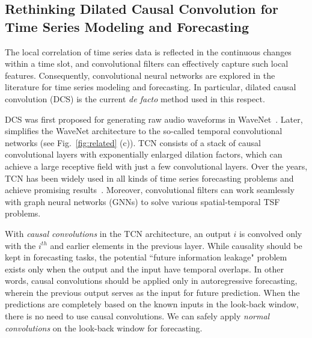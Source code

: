 \documentclass{article}
\begin{document}
\fi


















\subsection{Rethinking Dilated Causal Convolution for Time Series Modeling and Forecasting}
\label{sec:rethinking_tcn}

The local correlation of time series data is reflected in the continuous changes within a time slot, and convolutional filters can effectively capture such local features. Consequently, convolutional neural networks are explored in the literature for time series modeling and forecasting. In particular, dilated causal convolution (DCS) is the current \emph{de facto} method used in this respect. 


DCS was first proposed for generating raw audio waveforms in WaveNet~\citep{Oord2016WaveNetAG}. Later,~\citep{Bai2018AnEE} simplifies the WaveNet architecture to the so-called temporal convolutional networks (see Fig.~\ref{fig:related} (c)). TCN consists of a stack of causal convolutional layers with exponentially enlarged dilation factors, which can achieve a large receptive field with just a few convolutional layers. Over the years, TCN has been widely used in all kinds of time series forecasting problems and achieve promising results~\citep{Wu2019GraphWF,Sen2019ThinkGA}. Moreover, convolutional filters can work seamlessly with graph neural networks (GNNs) to solve various spatial-temporal TSF problems. 

With \emph{causal convolutions} in the TCN architecture, an output $i$ is convolved only with the $i^{th}$ and earlier elements in the previous layer. While causality should be kept in forecasting tasks, the potential ``future information leakage" problem exists only when the output and the input have temporal overlaps. In other words, causal convolutions should be applied only in autoregressive forecasting, wherein the previous output serves as the input for future prediction. When the predictions are completely based on the known inputs in the look-back window, there is no need to use causal convolutions. We can safely apply \textit{normal convolutions} on the look-back window for forecasting. 
\end{document}

